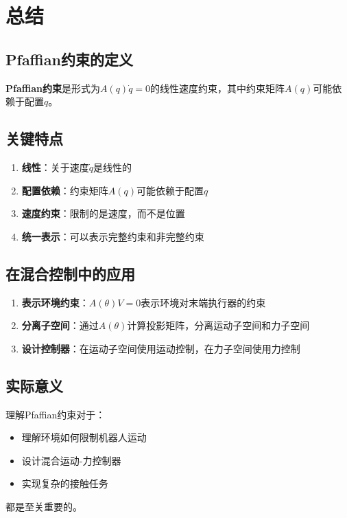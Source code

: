 \documentclass[12pt,a4paper]{article}
\begin{document}
\section{总结}

\subsection{Pfaffian约束的定义}

\textbf{Pfaffian约束}是形式为$A(q)\dot{q} = 0$的线性速度约束，其中约束矩阵$A(q)$可能依赖于配置$q$。

\subsection{关键特点}

\begin{enumerate}
\item \textbf{线性}：关于速度$\dot{q}$是线性的
\item \textbf{配置依赖}：约束矩阵$A(q)$可能依赖于配置$q$
\item \textbf{速度约束}：限制的是速度，而不是位置
\item \textbf{统一表示}：可以表示完整约束和非完整约束
\end{enumerate}

\subsection{在混合控制中的应用}

\begin{enumerate}
\item \textbf{表示环境约束}：$A(\theta)V = 0$表示环境对末端执行器的约束
\item \textbf{分离子空间}：通过$A(\theta)$计算投影矩阵，分离运动子空间和力子空间
\item \textbf{设计控制器}：在运动子空间使用运动控制，在力子空间使用力控制
\end{enumerate}

\subsection{实际意义}

理解Pfaffian约束对于：
\begin{itemize}
\item 理解环境如何限制机器人运动
\item 设计混合运动-力控制器
\item 实现复杂的接触任务
\end{itemize}

都是至关重要的。
\end{document}
